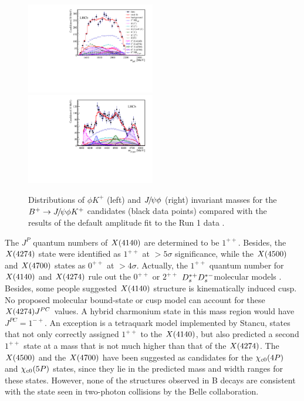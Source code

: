 \begin{figure}[hbtp]
  \begin{center}
    \includegraphics[width=0.5\textwidth]{Figures/01_Introduction/Physics/from_Zcs/newbase_PhiKh.pdf}%
    \includegraphics[width=0.5\textwidth]{Figures/01_Introduction/Physics/from_Zcs/newbase_JpsiPhih.pdf}
  \end{center}
\caption{
    Distributions of $\phi K^+$ (left) and ${{J\mskip -3mu/\mskip -2mu\psi}}\phi$ (right)
    invariant masses for the ${{{B}^+}}\rightarrow{\ensuremath{{J\mskip -3mu/\mskip -2mu\psi}}} \phi K^+$ candidates (black data points)
    compared with the results of the default amplitude fit
    to the Run 1 data \supercite{LHCb-PAPER-2016-018}.}
  \label{fig:defmasses}
\end{figure}

The $J^{P}$ quantum numbers of $X(4140)$ are determined to be $1^{++}$.
Besides,
the $X(4274)$ state were identified as $1^{++}$ at  $>5\sigma$ significance,
while the $X(4500)$ and $X(4700)$ states as $0^{++}$ at $>4\sigma$. 
Actually,
the $1^{++}$ quantum number for $X(4140)$ and $X(4274)$ rule out the $0^{++}$ or $2^{++}$ ${{D}^{*+}_{s}}{{D}^{*-}_{s}}$molecular models
\supercite{PhysRevD.80.017502,PhysRevD.80.054019,PhysRevD.80.114013,ALBUQUERQUE2009186,Wang:2009ry,Ding:2009vd}.
Besides,
some people suggested $X(4140)$ structure is kinematically induced cusp\supercite{PhysRevD.91.034009,KARLINER2016365}.
No proposed molecular bound-state or cusp model can account for these $X(4274) J^{PC}$ values. 
A hybrid charmonium state in this mass region would have $J^{PC}=1^{-+}$\supercite{MAHAJAN2009228}.
An exception is a tetraquark model implemented by Stancu\supercite{Stancu_2010},
states that not only correctly assigned $1^{++}$ to the $X(4140)$, 
but also predicted a second $1^{++}$ state at a mass that is not much higher than that of the $X(4274)$.
The $X(4500)$ and the $X(4700)$ have been suggested as candidates for the ${\chi_{{c} 0}}(4P)$ and ${\chi_{{c} 0}}(5P)$ states, 
since they lie in the predicted mass and width ranges for these states\supercite{PhysRevD.94.074007,PhysRevD.94.114018}.
However,
none of the \jpsi structures observed in B decays are consistent with the state seen in two-photon collisions by the Belle collaboration.\supercite{PhysRevLett.104.112004}

